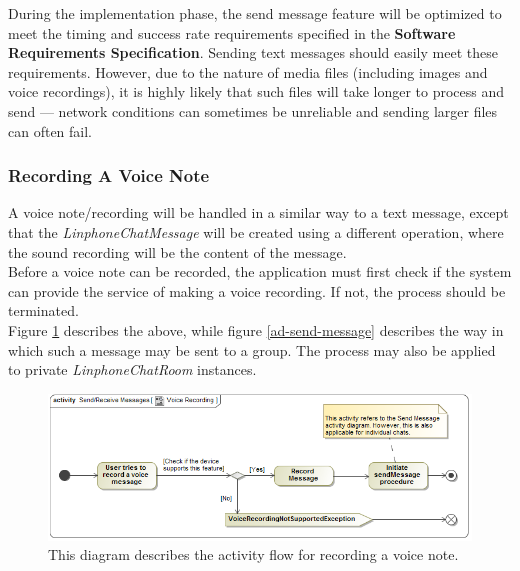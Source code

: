 \documentclass[11pt]{article}
\begin{document}
During the implementation phase, the send message feature will be optimized to meet the timing and success rate requirements specified in the \textbf{Software Requirements Specification}. Sending text messages should easily meet these requirements. However, due to the nature of media files (including images and voice recordings), it is highly likely that such files will take longer to process and send --- network conditions can sometimes be unreliable and sending larger files can often fail.
\subsubsection{Recording A Voice Note}
A voice note/recording will be handled in a similar way to a text message, except that the \textit{LinphoneChatMessage} will be created using a different operation, where the sound recording will be the content of the message.\\
Before a voice note can be recorded, the application must first check if the system can provide the service of making a voice recording. If not, the process should be terminated.\\
Figure \ref{ad-voice-record} describes the above, while figure \ref{ad-send-message} describes the way in which such a message may be sent to a group. The process may also be applied to private \textit{LinphoneChatRoom} instances.
\begin{figure}[H]
\centering
\includegraphics[width=5in]{./images/activity_voice_record.png}
\caption[Voice Recording Activity Diagram]{This diagram describes the activity flow for recording a voice note.}
\label{ad-voice-record}
\end{figure}
\end{document}
